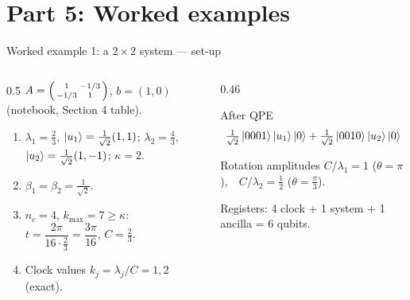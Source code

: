 \documentclass[aspectratio=169,11pt]{beamer}
\begin{document}
\section{Part 5: Worked examples}
\begin{frame}{Worked example 1: a $2\times2$ system --- set-up}
  \begin{columns}[T]
    \begin{column}{0.5\textwidth}
      \small $A = \begin{psmallmatrix}1&-1/3\\-1/3&1\end{psmallmatrix}$, $b = (1, 0)$ (notebook, Section 4 table).
      \begin{enumerate}
        \item $\lambda_1 = \frac23$, $\ket{u_1} = \frac{1}{\sqrt2}(1, 1)$; $\lambda_2 = \frac43$, $\ket{u_2} = \frac{1}{\sqrt2}(1, -1)$; $\kappa = 2$.
        \item $\beta_1 = \beta_2 = \frac{1}{\sqrt2}$.
        \item $n_c = 4$, $k_{\max} = 7 \ge \kappa$: $t = \dfrac{2\pi}{16\cdot\frac23} = \dfrac{3\pi}{16}$, $C = \frac23$.
        \item Clock values $k_j = \lambda_j/C = 1, 2$ (exact).
      \end{enumerate}
    \end{column}
    \begin{column}{0.46\textwidth}
      \begin{block}{After QPE}
        \[ \tfrac{1}{\sqrt2}\ket{0001}\ket{u_1}\ket0 + \tfrac{1}{\sqrt2}\ket{0010}\ket{u_2}\ket0 \]
      \end{block}
      \begin{block}{Rotation amplitudes}
        $C/\lambda_1 = 1$ ($\theta = \pi$),\ \ $C/\lambda_2 = \frac12$ ($\theta = \frac\pi3$).
      \end{block}
      \small Registers: 4 clock + 1 system + 1 ancilla = 6 qubits.
    \end{column}
  \end{columns}
\end{frame}
\end{document}
